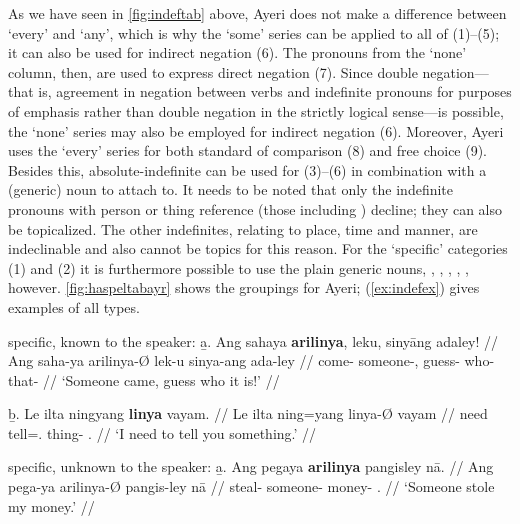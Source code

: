 As we have seen in \autoref{fig:indeftab} above, Ayeri does not make a
difference between `every' and `any', which is why the `some' series can be
applied to all of (1)--(5); it can also be used for indirect negation (6). The
pronouns from the `none' column, then, are used to express direct negation (7).
Since double negation---that is, agreement in negation between verbs and
indefinite pronouns for purposes of emphasis rather than double negation in the
strictly logical sense---is possible, the `none' series may also be employed
for indirect negation (6). Moreover, Ayeri uses the `every' series for both
standard of comparison (8) and free choice (9). Besides this, 
absolute-indefinite  can be used for (3)--(6) in combination 
with a (generic) noun to attach to. It needs to be noted that only the 
indefinite pronouns with person or thing reference (those including 
) decline; they can also be topicalized. The other indefinites, 
relating to place, time and manner, are indeclinable and also cannot be topics 
for this reason.
%
%
For the `specific' categories (1) and (2) it is furthermore possible to use the
plain generic nouns, , ,
, , , 
however. \autoref{fig:haspeltabayr} shows the groupings for Ayeri; 
(\ref{ex:indefex}) gives examples of all types.

\pex[labeltype=numeric,interpartskip=1em]\label{ex:indefex}
\a specific, known to the speaker:\vspace{.5em} %
	\beginsubsub
	\b{a.} \begingl
		\gla Ang sahaya \textbf{arilinya}, leku, sinyāng adaley! //
		\glb Ang saha-ya arilinya-Ø lek-u sinya-ang ada-ley //
		\glc \AgtT{} come-\TsgM{} someone-\Top{}, guess-\Imp{} 
			who-\Aarg{} that-\PargI{} //
		\glft `Someone came, guess who it is!' //
		\endgl\vspace{.5em}
		
	\b{b.} \begingl
		\gla Le ilta ningyang \textbf{linya} vayam. //
		\glb Le ilta ning=yang linya-Ø vayam //
		\glc \PatTI{} need tell=\Fsg{}.\Aarg{} thing-\Top{} 
			\Ssg{}.\Dat{} //
		\glft `I need to tell you something.' //
		\endgl
	\endsubsub

\a specific, unknown to the speaker:\vspace{.5em} %
	\beginsubsub
	\b{a.} \begingl
		\gla Ang pegaya \textbf{arilinya} pangisley nā. //
		\glb Ang pega-ya arilinya-Ø pangis-ley nā //
		\glc \AgtT{} steal-\TsgM{} someone-\Top{} money-\PargI{} 
			\Fsg{}.\Gen{} //
		\glft `Someone stole my money.' //
		\endgl\vspace{.5em}
		
